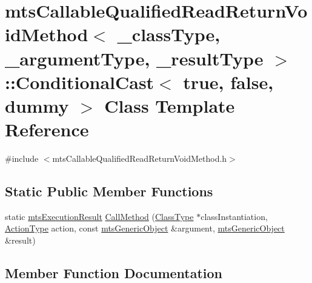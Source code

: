 \hypertarget{classmts_callable_qualified_read_return_void_method_1_1_conditional_cast_3_01true_00_01false_00_01dummy_01_4}{}\section{mts\+Callable\+Qualified\+Read\+Return\+Void\+Method$<$ \+\_\+class\+Type, \+\_\+argument\+Type, \+\_\+result\+Type $>$\+:\+:Conditional\+Cast$<$ true, false, dummy $>$ Class Template Reference}
\label{classmts_callable_qualified_read_return_void_method_1_1_conditional_cast_3_01true_00_01false_00_01dummy_01_4}


{\ttfamily \#include $<$mts\+Callable\+Qualified\+Read\+Return\+Void\+Method.\+h$>$}

\subsection*{Static Public Member Functions}
\begin{DoxyCompactItemize}
\item 
static \hyperlink{classmts_execution_result}{mts\+Execution\+Result} \hyperlink{classmts_callable_qualified_read_return_void_method_1_1_conditional_cast_3_01true_00_01false_00_01dummy_01_4_a43d27bb53c8c31194037a095ef66ac3c}{Call\+Method} (\hyperlink{classmts_callable_qualified_read_return_void_method_ae99cfab8208eb374f2cdf01c97edfa3b}{Class\+Type} $\ast$class\+Instantiation, \hyperlink{classmts_callable_qualified_read_return_void_method_a90bf5eae1c7fdee0396313ce6de022bb}{Action\+Type} action, const \hyperlink{classmts_generic_object}{mts\+Generic\+Object} \&argument, \hyperlink{classmts_generic_object}{mts\+Generic\+Object} \&result)
\end{DoxyCompactItemize}


\subsection{Member Function Documentation}
\hypertarget{classmts_callable_qualified_read_return_void_method_1_1_conditional_cast_3_01true_00_01false_00_01dummy_01_4_a43d27bb53c8c31194037a095ef66ac3c}{}
